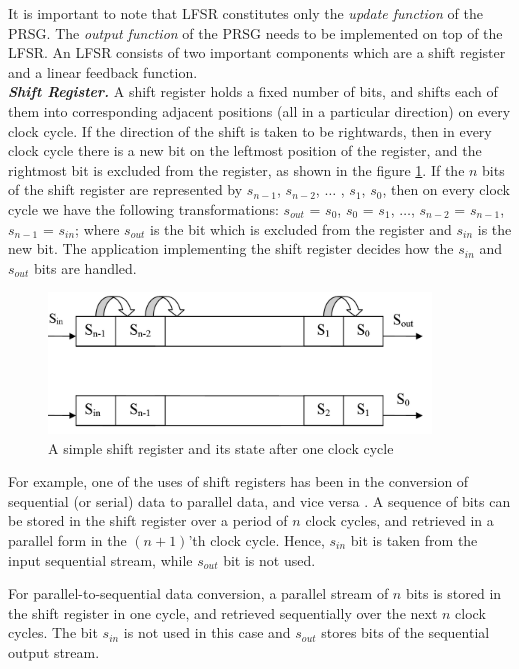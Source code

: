 It is important to note that LFSR constitutes only the \emph{update function} of the PRSG. The \emph{output function} of the PRSG needs to be implemented on top of the LFSR. An LFSR consists of two important components which are a shift register and a linear feedback function.\\

\textbf{\emph{Shift Register.}} A shift register holds a fixed number of bits, and shifts each of them into corresponding adjacent positions (all in a particular direction) on every clock cycle. If the direction of the shift is taken to be rightwards, then in every clock cycle there is a new bit on the leftmost position of the register, and the rightmost bit is excluded from the register, as shown in the figure \ref{fig:shift-register}. If the $n$ bits of the shift register are represented by $s_{n-1}$, $s_{n-2}$, $\ldots$ , $s_{1}$, $s_{0}$, then on every clock cycle we have the following transformations: $s_{out}$ = $s_{0}$, $s_{0}$ = $s_{1}$, $\ldots$, $s_{n-2}$ = $s_{n-1}$, $s_{n-1}$ = $s_{in}$; where $s_{out}$ is the bit which is excluded from the register and $s_{in}$ is the new bit. The application implementing the shift register decides how the $s_{in}$ and $s_{out}$ bits are handled.

\begin{figure}[ht!]
	\centering
		\includegraphics[width=4in]{./figures/shift-register.PNG}
	\caption{A simple shift register and its state after one clock cycle}	
	\label{fig:shift-register}
\end{figure}

For example, one of the uses of shift registers has been in the conversion of sequential (or serial) data to parallel data, and vice versa \cite{lfsr-link}. A sequence of bits can be stored in the shift register over a period of $n$ clock cycles, and retrieved in a parallel form in the $(n+1)$'th clock cycle. Hence, $s_{in}$ bit is taken from the input sequential stream, while $s_{out}$ bit is not used. 

For parallel-to-sequential data conversion, a parallel stream of $n$ bits is stored in the shift register in one cycle, and retrieved sequentially over the next $n$ clock cycles. The bit $s_{in}$ is not used in this case and $s_{out}$ stores bits of the sequential output stream.\\

